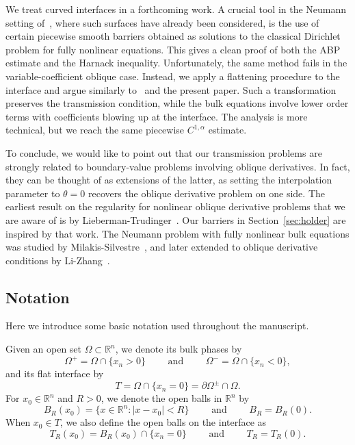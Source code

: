 \documentclass[letter,11pt]{amsart}
\newcommand{\R}{\mathbb{R}}
\theoremstyle{definition}
\numberwithin{equation}{section}
\begin{document}
We treat curved interfaces in a forthcoming work.
A crucial tool in the Neumann setting of~\cite{SS}, where such surfaces have already been considered, is the use of certain piecewise smooth barriers obtained as solutions to the classical Dirichlet problem for fully nonlinear equations.
This gives a clean proof of both the ABP estimate and the Harnack inequality.
Unfortunately, the same method fails in the variable-coefficient oblique case.
Instead, we apply a flattening procedure to the interface and argue similarly to~\cite{E} and the present paper.
Such a transformation preserves the transmission condition, while the bulk equations involve lower order terms with coefficients blowing up at the interface.
The analysis is more technical, but we reach the same piecewise $C^{1,\alpha}$ estimate.

\medskip

To conclude, we would like to point out that our transmission problems are strongly related to boundary-value problems involving oblique derivatives.
In fact, they can be thought of as extensions of the latter, as setting the interpolation parameter to $\theta = 0$ recovers the oblique derivative problem on one side.
The earliest result on the regularity for nonlinear oblique derivative problems that we are aware of is by Lieberman-Trudinger~\cite{LT}.
Our barriers in Section~\ref{sec:holder} are inspired by that work.
The Neumann problem with fully nonlinear bulk equations was studied by Milakis-Silvestre~\cite{MS}, and later extended to oblique derivative conditions by Li-Zhang~\cite{LZ}.

\subsection{Notation}
\label{sub:notation}

Here we introduce some basic notation used throughout the manuscript.

\medskip

Given an open set $\Omega \subset \R^n$, we denote its bulk phases by
\[
\Omega^{+} = \Omega \cap \{x_n > 0\} \qquad \text{ and } \qquad \Omega^{-} = \Omega \cap \{x_n < 0\},
\]
and its flat interface by
\[
T = \Omega \cap \{x_n = 0\} = \partial \Omega^{\pm} \cap \Omega.
\]
For $x_0 \in \R^{n}$ and $R> 0$, we denote the open balls in $\R^{n}$ by
\[
B_{R}(x_0) = \{x \in \R^n \colon |x - x_0| < R\} \qquad \text{ and } \qquad B_R = B_{R}(0).
\]
When $x_0 \in T$, we also define the open balls on the interface as
\[
T_R(x_0) = B_R(x_0) \cap \{x_n = 0\}\qquad \text{ and }\qquad T_R = T_R(0).
\]
\end{document}
